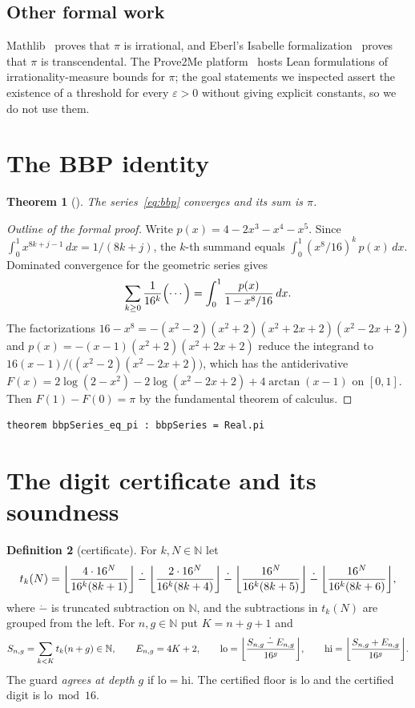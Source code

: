 \documentclass[11pt]{amsart}
\newtheorem{theorem}{Theorem}[section]
\theoremstyle{definition}
\newtheorem{definition}[theorem]{Definition}
\theoremstyle{remark}
\newcommand{\N}{\mathbb{N}}
\newcommand{\Sng}{S_{n,g}}
\newcommand{\Eng}{E_{n,g}}
\newcommand{\lo}{\mathrm{lo}}
\newcommand{\hi}{\mathrm{hi}}
\newcommand{\monus}{\mathbin{\dot{-}}}
\DeclarePairedDelimiter{\floor}{\lfloor}{\rfloor}
\begin{document}
\subsection*{Other formal work}
Mathlib~\cite{Mathlib2020} proves that $\pi$ is irrational, and Eberl's
Isabelle formalization~\cite{EberlPiTranscendental} proves that $\pi$ is
transcendental. The Prove2Me platform~\cite{Prove2MePi} hosts Lean
formulations of irrationality-measure bounds for $\pi$; the goal statements
we inspected assert the existence of a threshold for every $\varepsilon>0$
without giving explicit constants, so we do not use them.

\section{The BBP identity}\label{sec:bbp}

\begin{theorem}[]\label{thm:bbp}
The series~\eqref{eq:bbp} converges and its sum is $\pi$.
\end{theorem}

\begin{proof}[Outline of the formal proof]
Write $p(x)=4-2x^3-x^4-x^5$. Since
$\int_0^1x^{8k+j-1}\,dx=1/(8k+j)$, the $k$-th summand equals
$\int_0^1(x^8/16)^k\,p(x)\,dx$. Dominated convergence for the geometric
series gives
\[
  \sum_{k\ge0}\frac{1}{16^k}\Bigl(\cdots\Bigr)=\int_0^1\frac{p(x)}{1-x^8/16}\,dx .
\]
The factorizations $16-x^8=-(x^2-2)(x^2+2)(x^2+2x+2)(x^2-2x+2)$ and
$p(x)=-(x-1)(x^2+2)(x^2+2x+2)$ reduce the integrand to
$16(x-1)/\bigl((x^2-2)(x^2-2x+2)\bigr)$, which has the antiderivative
$F(x)=2\log(2-x^2)-2\log(x^2-2x+2)+4\arctan(x-1)$ on $[0,1]$. Then
$F(1)-F(0)=\pi$ by the fundamental theorem of calculus.
\end{proof}

\begin{lstlisting}
theorem bbpSeries_eq_pi : bbpSeries = Real.pi
\end{lstlisting}

\section{The digit certificate and its soundness}\label{sec:cert}

\begin{definition}[certificate]\label{def:cert}
For $k,N\in\N$ let
\[
  t_k(N)=\floor*{\frac{4\cdot16^N}{16^k(8k+1)}}\monus
  \floor*{\frac{2\cdot16^N}{16^k(8k+4)}}\monus
  \floor*{\frac{16^N}{16^k(8k+5)}}\monus
  \floor*{\frac{16^N}{16^k(8k+6)}},
\]
where $\monus$ is truncated subtraction on $\N$, and the subtractions in
$t_k(N)$ are grouped from the left. For $n,g\in\N$ put
$K=n+g+1$ and
\[
  \Sng=\sum_{k<K}t_k(n+g)\in\N,\qquad \Eng=4K+2,\qquad
  \lo=\floor*{\frac{\Sng\monus\Eng}{16^g}},\qquad
  \hi=\floor*{\frac{\Sng+\Eng}{16^g}} .
\]
The guard \emph{agrees at depth $g$} if $\lo=\hi$. The certified floor is
$\lo$ and the certified digit is $\lo\bmod16$.
\end{definition}
\end{document}
